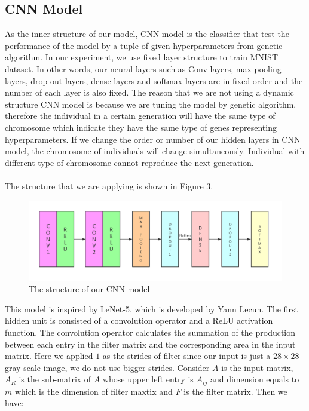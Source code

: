 \documentclass[12pt]{article}
\begin{document}
\subsection{CNN Model}
As the inner structure of our model, CNN model is the classifier that test the performance of the model by a tuple of given hyperparameters from genetic algorithm. In our experiment, we use fixed layer structure to train MNIST dataset. In other words, our neural layers such as Conv layers, max pooling layers, drop-out layers, dense layers and softmax layers are in fixed order and the number of each layer is also fixed. The reason that we are not using a dynamic structure CNN model is because we are tuning the model by genetic algorithm, therefore the individual in a certain generation will have the same type of chromosome which indicate they have the same type of genes representing hyperparameters. If we change the order or number of our hidden layers in CNN model, the chromosome of individuals will change simultaneously. Individual with different type of chromosome cannot reproduce the next generation.\\
~\\
The structure that we are applying is shown in Figure 3. 
\begin{figure}\label{fig:pic3}
\begin{center}
\includegraphics[width = 6.1in]{CNN.png}
\caption{The structure of our CNN model}
\end{center}
\end{figure}
This model is inspired by LeNet-5, which is developed by Yann Lecun. The first hidden unit is consisted of a convolution operator and a ReLU activation function. The convolution operator calculates the summation of the production between each entry in the filter matrix and the corresponding area in the input matrix. Here we applied $1$ as the strides of filter since our input is just a $28 \times 28$ gray scale image, we do not use bigger strides. Consider $A$ is the input matrix, $A_R $ is the sub-matrix of $A$ whose upper left entry is $A_{ij}$ and dimension equals to $m$ which is the dimension of filter maxtix and $F$ is the filter matrix. Then we have:\\
\end{document}
